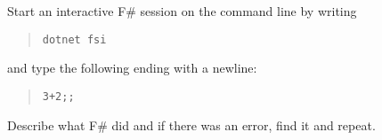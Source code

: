 \label{ex:interactiveSession}
Start an interactive F\# session on the command line by writing
\begin{quote}
\lstinline[language=console]{dotnet fsi}
\end{quote}
and type the following ending with a newline:
\begin{quote}
\lstinline{3+2;;}
\end{quote}
Describe what F\# did and if there was an error, find it and repeat.
